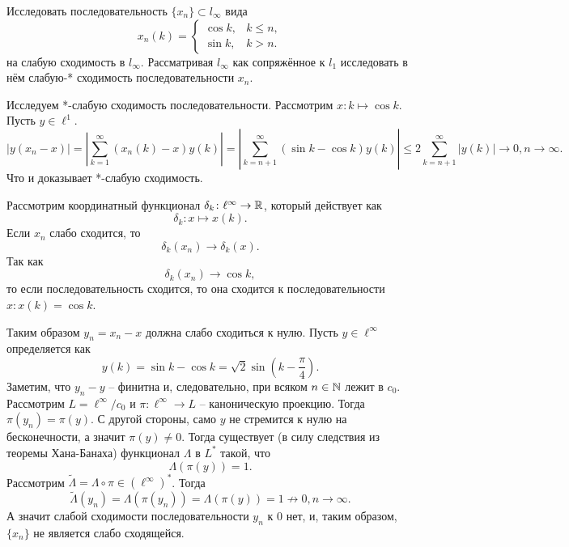\begin{task}[T6]
    Исследовать последовательность $\{x_n\} \subset l_\infty$ вида
    \[
        x_n(k) = \begin{cases}
                     \cos k, & k \leq n, \\
                     \sin k, & k > n.
        \end{cases}
    \]
    на слабую сходимость в $l_\infty$.
    Рассматривая $l_\infty$ как сопряжённое к $l_1$ исследовать в нём слабую-* сходимость последовательности $x_n$.
\end{task}
\begin{solution}
    Исследуем *-слабую сходимость последовательности.
    Рассмотрим $x\colon k \mapsto \cos k$.
    Пусть $y \in \ell^1$.
    \[
        |y(x_n - x)| = \left|\sum_{k = 1}^{\infty} (x_n(k) - x)y(k)\right| = \left|\sum_{k = n + 1}^{\infty} (\sin k - \cos k) y(k) \right| \leq 2 \sum_{k = n + 1}^{\infty} |y(k)| \rightarrow 0, n \rightarrow \infty.
    \]
    Что и доказывает *-слабую сходимость.

    Рассмотрим координатный функционал $\delta_k\colon \ell^{\infty} \to \mathbb{R}$, который действует как
    \[
        \delta_k \colon x \mapsto x(k).
    \]
    Если $x_n$ слабо сходится, то
    \[
        \delta_k(x_n) \rightarrow \delta_k(x).
    \]
    Так как
    \[
        \delta_k(x_n) \rightarrow \cos k,
    \]
    то если последовательность сходится, то она сходится к последовательности $x\colon x(k) = \cos k$.

    Таким образом $y_n = x_n - x$ должна слабо сходиться к нулю.
    Пусть $y \in \ell^{\infty}$ определяется как
    \[
        y(k) = \sin k - \cos k = \sqrt{2}\sin\left(k - \frac{\pi}{4}\right).
    \]
    Заметим, что $y_n - y$ -- финитна и, следовательно, при всяком $n \in \mathbb{N}$ лежит в $c_{0}$.
    Рассмотрим $L = \ell^\infty/c_0$ и $\pi\colon \ell^{\infty} \to L$ -- каноническую проекцию.
    Тогда $\pi(y_n) = \pi(y)$.
    С другой стороны, само $y$ не стремится к нулю на бесконечности, а значит $\pi(y) \neq 0$.
    Тогда существует (в силу следствия из теоремы Хана-Банаха) функционал $\Lambda$ в $L^*$ такой, что
    \[
        \Lambda(\pi(y)) = 1.
    \]
    Рассмотрим $\tilde{\Lambda} = \Lambda \circ \pi \in (\ell^\infty)^*$.
    Тогда
    \[
        \tilde{\Lambda}(y_n) = \Lambda(\pi(y_n)) = \Lambda(\pi(y)) = 1 \not\rightarrow 0, n \rightarrow \infty.
    \]
    А значит слабой сходимости последовательности $y_n$ к $0$ нет, и, таким образом, $\{x_n\}$ не является слабо сходящейся.
\end{solution}
